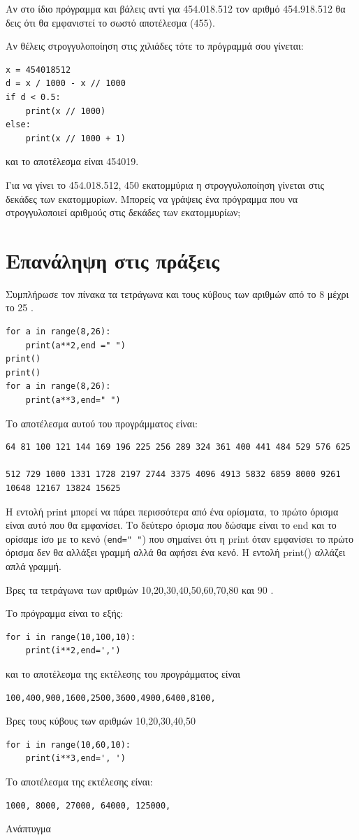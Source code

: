 Αν στο ίδιο πρόγραμμα και βάλεις αντί για 454.018.512 τον αριθμό 454.918.512 θα δεις ότι θα εμφανιστεί το σωστό αποτέλεσμα (455).

Αν θέλεις στρογγυλοποίηση στις χιλιάδες τότε το πρόγραμμά σου γίνεται:
\begin{lstlisting}
x = 454018512
d = x / 1000 - x // 1000
if d < 0.5:
    print(x // 1000)
else:
    print(x // 1000 + 1)
\end{lstlisting}
και το αποτέλεσμα είναι 454019.

\begin{exercise}
Για να γίνει το 454.018.512, 450 εκατομμύρια  η στρογγυλοποίηση γίνεται στις δεκάδες των εκατομμυρίων. Μπορείς να γράψεις ένα πρόγραμμα που να στρογγυλοποιεί αριθμούς στις δεκάδες των εκατομμυρίων;
\end{exercise}

\section{Επανάληψη στις πράξεις}
\begin{exercise}
Συμπλήρωσε τον πίνακα τα τετράγωνα και τους κύβους των αριθμών από το 8 μέχρι το 25 .
\end{exercise}
\begin{lstlisting}
for a in range(8,26):
    print(a**2,end =" ")
print()
print()
for a in range(8,26):
    print(a**3,end=" ")
\end{lstlisting}
Το αποτέλεσμα αυτού του προγράμματος είναι:

\begin{lstlisting}
64 81 100 121 144 169 196 225 256 289 324 361 400 441 484 529 576 625 

512 729 1000 1331 1728 2197 2744 3375 4096 4913 5832 6859 8000 9261 
10648 12167 13824 15625
\end{lstlisting}

Η εντολή print μπορεί να πάρει περισσότερα από ένα ορίσματα, το πρώτο όρισμα είναι αυτό που θα εμφανίσει. Το δεύτερο όρισμα που δώσαμε είναι το end και το ορίσαμε ίσο με το κενό (\lstinline{end=" "}) που σημαίνει ότι η print όταν εμφανίσει το πρώτο όρισμα δεν θα αλλάξει γραμμή αλλά θα αφήσει ένα κενό. Η εντολή print() αλλάζει απλά γραμμή.
\begin{exercise}
Βρες τα τετράγωνα των αριθμών 10,20,30,40,50,60,70,80 και 90 .
\end{exercise}
Το πρόγραμμα είναι το εξής:
\begin{lstlisting}
for i in range(10,100,10):
    print(i**2,end=',')
\end{lstlisting}
και το αποτέλεσμα της εκτέλεσης του προγράμματος είναι
\begin{lstlisting}
100,400,900,1600,2500,3600,4900,6400,8100,
\end{lstlisting}

\begin{exercise}
Βρες τους κύβους των αριθμών 10,20,30,40,50
\end{exercise}

\begin{lstlisting}
for i in range(10,60,10):
    print(i**3,end=', ')  
\end{lstlisting}
Το αποτέλεσμα της εκτέλεσης είναι:
\begin{lstlisting}
1000, 8000, 27000, 64000, 125000, 
\end{lstlisting}

Ανάπτυγμα